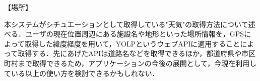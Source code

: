 【場所】
\par
本システムがシチュエーションとして取得している"天気"の取得方法について述べる．ユーザの現在位置周辺にある施設名や地形といった場所情報を，GPSによって取得した緯度経度を用いて，YOLPというウェブAPIに適用することによって取得する．先にあげたAPIは道路名などを取得できるほか，都道府県や市区町村まで取得できるため，アプリケーションの今後の展開として，今現在利用している以上の使い方を検討できるかもしれない．

